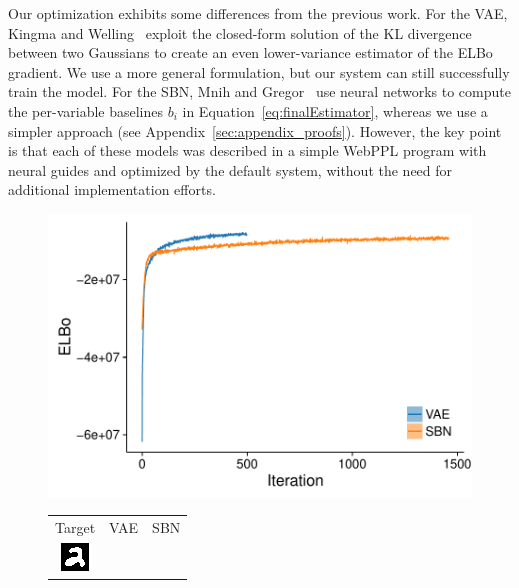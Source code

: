 Our optimization exhibits some differences from the previous work.
For the VAE, Kingma and Welling~\cite{AEVB} exploit the closed-form solution of the KL divergence between two Gaussians to create an even lower-variance estimator of the ELBo gradient. We use a more general formulation, but our system can still successfully train the model.
For the SBN, Mnih and Gregor~\cite{NVIL} use neural networks to compute the per-variable baselines $b_i$ in Equation~\ref{eq:finalEstimator}, whereas we use a simpler approach (see Appendix~\ref{sec:appendix_proofs}).
However, the key point is that each of these models was described in a simple WebPPL program with neural guides and optimized by the default system, without the need for additional implementation efforts.

\begin{figure}
\begin{minipage}{0.5\linewidth}
\centering
\includegraphics[width=\linewidth]{figs/results/vae_sbn/elboProgress.pdf}
\end{minipage}
%
\hspace{2em}
%
\begin{minipage}{0.5\linewidth}
\setlength{\tabcolsep}{1pt}
\centering
\begin{tabular}{c  c c c c c c}
Target & \multicolumn{3}{c}{VAE} & \multicolumn{3}{c}{SBN}
\\
 \includegraphics[width=0.12\linewidth]{figs/results/vae_sbn/vae_encodeDecode_target_000.png}
 \hspace{3pt}

\end{tabular}
\end{minipage}
\end{figure}
